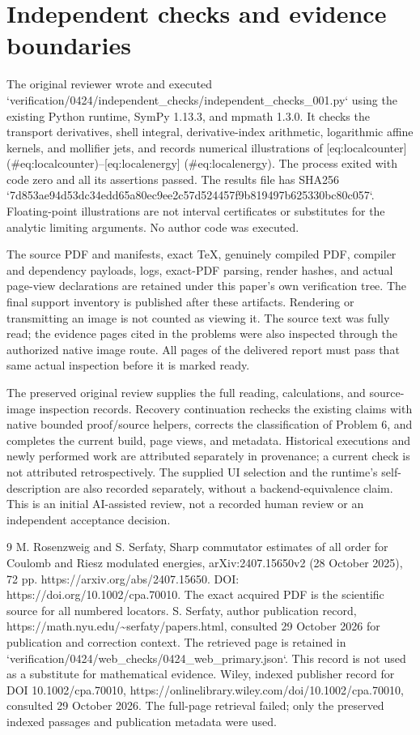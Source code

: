 \documentclass[10pt]{article}
\begin{document}
\section*{Independent checks and evidence boundaries}
The original reviewer wrote and executed `verification/0424/independent\_checks/independent\_checks\_001.py` using the existing Python runtime, SymPy 1.13.3, and mpmath 1.3.0. It checks the transport derivatives, shell integral, derivative-index arithmetic, logarithmic affine kernels, and mollifier jets, and records numerical illustrations of [eq:localcounter] (\#eq:localcounter)–[eq:localenergy] (\#eq:localenergy). The process exited with code zero and all its assertions passed. The results file has SHA256 `7d853ae94d53dc34edd65a80ec9ee2c57d524457f9b819497b625330bc80c057`. Floating-point illustrations are not interval certificates or substitutes for the analytic limiting arguments. No author code was executed.\par
The source PDF and manifests, exact TeX, genuinely compiled PDF, compiler and dependency payloads, logs, exact-PDF parsing, render hashes, and actual page-view declarations are retained under this paper’s own verification tree. The final support inventory is published after these artifacts. Rendering or transmitting an image is not counted as viewing it. The source text was fully read; the evidence pages cited in the problems were also inspected through the authorized native image route. All pages of the delivered report must pass that same actual inspection before it is marked ready.\par
The preserved original review supplies the full reading, calculations, and source-image inspection records. Recovery continuation rechecks the existing claims with native bounded proof/source helpers, corrects the classification of Problem 6, and completes the current build, page views, and metadata. Historical executions and newly performed work are attributed separately in provenance; a current check is not attributed retrospectively. The supplied UI selection and the runtime’s self-description are also recorded separately, without a backend-equivalence claim. This is an initial AI-assisted review, not a recorded human review or an independent acceptance decision.\par
9 M. Rosenzweig and S. Serfaty, Sharp commutator estimates of all order for Coulomb and Riesz modulated energies, arXiv:2407.15650v2 (28 October 2025), 72 pp. https://arxiv.org/abs/2407.15650. DOI: https://doi.org/10.1002/cpa.70010. The exact acquired PDF is the scientific source for all numbered locators. S. Serfaty, author publication record, https://math.nyu.edu/\textasciitilde{}serfaty/papers.html, consulted 29 October 2026 for publication and correction context. The retrieved page is retained in `verification/0424/web\_checks/0424\_web\_primary.json`. This record is not used as a substitute for mathematical evidence. Wiley, indexed publisher record for DOI 10.1002/cpa.70010, https://onlinelibrary.wiley.com/doi/10.1002/cpa.70010, consulted 29 October 2026. The full-page retrieval failed; only the preserved indexed passages and publication metadata were used.\par
\end{document}
